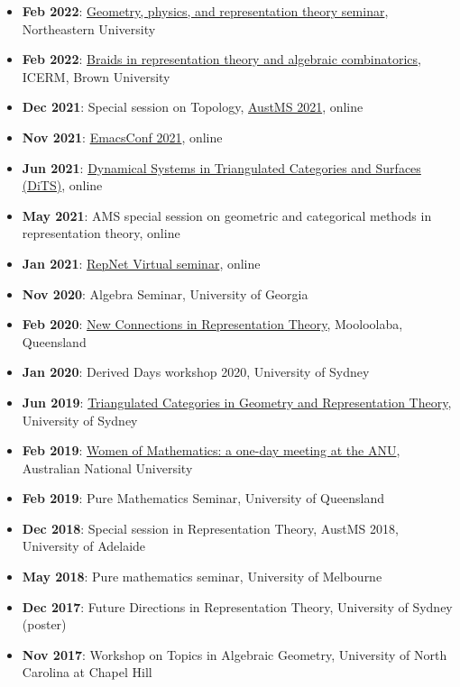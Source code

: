 \documentclass[a4paper]{moderncv}
\begin{document}
\begin{itemize}
\item \textbf{Feb 2022}: \href{http://mathserver.neu.edu/\~robin/Seminars/GPRT/index.html}{Geometry, physics, and representation theory seminar}, Northeastern University
\item \textbf{Feb 2022}: \href{https://icerm.brown.edu/programs/sp-s22/w1/}{Braids in representation theory and algebraic combinatorics}, ICERM, Brown University
\item \textbf{Dec 2021}: Special session on Topology, \href{https://austms.org.au/event/austms-2021/}{AustMS 2021}, online
\item \textbf{Nov 2021}: \href{https://emacsconf.org/2021/}{EmacsConf 2021}, online
\item \textbf{Jun 2021}: \href{https://sites.google.com/view/symposium-dits/}{Dynamical Systems in Triangulated Categories and Surfaces (DiTS)}, online
\item \textbf{May 2021}: AMS special session on geometric and categorical methods in representation theory, online
\item \textbf{Jan 2021}: \href{https://sites.google.com/view/repnetvirtualseminar/home}{RepNet Virtual seminar}, online
\item \textbf{Nov 2020}: Algebra Seminar, University of Georgia
\item \textbf{Feb 2020}: \href{https://sites.google.com/view/mooloolaba2020/home}{New Connections in Representation Theory}, Mooloolaba, Queensland
\item \textbf{Jan 2020}: Derived Days workshop 2020, University of Sydney
\item \textbf{Jun 2019}: \href{https://sites.google.com/site/ausreptheory/workshop-2019}{Triangulated Categories in Geometry and Representation Theory}, University of Sydney
\item \textbf{Feb 2019}: \href{https://genderinstitute.anu.edu.au/women-mathematics-one-day-meeting-anu}{Women of Mathematics: a one-day meeting at the ANU}, Australian National University
\item \textbf{Feb 2019}: Pure Mathematics Seminar, University of Queensland
\item \textbf{Dec 2018}: Special session in Representation Theory, AustMS 2018, University of Adelaide
\item \textbf{May 2018}: Pure mathematics seminar, University of Melbourne
\item \textbf{Dec 2017}: Future Directions in Representation Theory, University of Sydney (poster)
\item \textbf{Nov 2017}: Workshop on Topics in Algebraic Geometry, University of North Carolina at Chapel Hill

\end{itemize}
\end{document}
